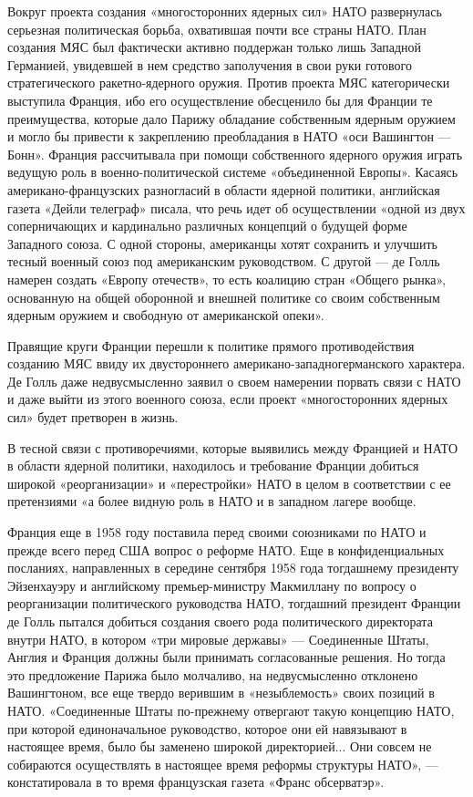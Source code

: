 \documentclass[12pt, a4paper, openany]{book}
\begin{document}
		Вокруг проекта создания «многосторонних ядерных сил» НАТО развернулась серьезная политическая борьба, охватившая почти все страны НАТО. План создания МЯС был фактически активно поддержан только лишь Западной Германией, увидевшей в нем средство заполучения в свои руки готового стратегического ракетно-ядерного оружия. Против проекта МЯС категорически выступила Франция, ибо его осуществление обесценило бы для Франции те преимущества, которые дало Парижу обладание собственным ядерным оружием и могло бы привести к закреплению преобладания в НАТО «оси Вашингтон — Бонн». Франция рассчитывала при помощи собственного ядерного оружия играть ведущую роль в военно-политической системе «объединенной Европы». Касаясь американо-французских разногласий в области ядерной политики, английская газета «Дейли телеграф» писала, что речь идет об осуществлении «одной из двух соперничающих и кардинально различных концепций о будущей форме Западного союза. С одной стороны, американцы хотят сохранить и улучшить тесный военный союз под американским руководством. С другой — де Голль намерен создать «Европу отечеств», то есть коалицию стран «Общего рынка», основанную на общей оборонной и внешней политике со своим собственным ядерным оружием и свободную от американской опеки».
		
		Правящие круги Франции перешли к политике прямого противодействия созданию МЯС ввиду их двустороннего американо-западногерманского характера. Де Голль даже недвусмысленно заявил о своем намерении порвать связи с НАТО и даже выйти из этого военного союза, если проект «многосторонних ядерных сил» будет претворен в жизнь.
		
		В тесной связи с противоречиями, которые выявились между Францией и НАТО в области ядерной политики, находилось и требование Франции добиться широкой «реорганизации» и «перестройки» НАТО в целом в соответствии с ее претензиями «а более видную роль в НАТО и в западном лагере вообще.
		
		Франция еще в 1958 году поставила перед своими союзниками по НАТО и прежде всего перед США вопрос о реформе НАТО. Еще в конфиденциальных посланиях, направленных в середине сентября 1958 года тогдашнему президенту Эйзенхауэру и английскому премьер-министру Макмиллану по вопросу о реорганизации политического руководства НАТО, тогдашний президент Франции де Голль пытался добиться создания своего рода политического директората внутри НАТО, в котором «три мировые державы» — Соединенные Штаты, Англия и Франция должны были принимать согласованные решения. Но тогда это предложение Парижа было молчаливо, на недвусмысленно отклонено Вашингтоном, все еще твердо верившим в «незыблемость» своих позиций в НАТО. «Соединенные Штаты по-прежнему отвергают такую концепцию НАТО, при которой единоначальное руководство, которое они ей навязывают в настоящее время, было бы заменено широкой директорией... Они совсем не собираются осуществлять в настоящее время реформы структуры НАТО», — констатировала в то время французская газета «Франс обсерватэр».
		
\end{document}
